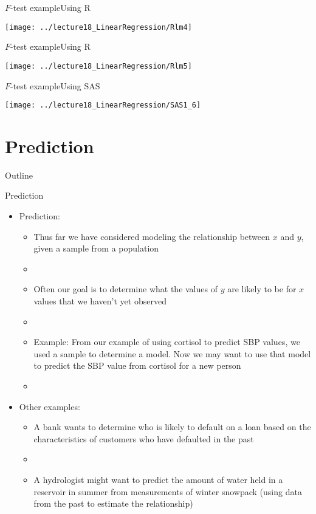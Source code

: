 \documentclass[xcolor=dvipsnames]{beamer}
\begin{document}
\begin{frame}{$F$-test example}{Using R}
	\begin{center}
		\texttt{[image: ../lecture18\_LinearRegression/Rlm4]}
	\end{center}
\end{frame}

\begin{frame}{$F$-test example}{Using R}
	\begin{center}
		\texttt{[image: ../lecture18\_LinearRegression/Rlm5]}
	\end{center}
\end{frame}

\begin{frame}{$F$-test example}{Using SAS}
	\begin{center}
		\texttt{[image: ../lecture18\_LinearRegression/SAS1\_6]}
	\end{center}
\end{frame}

\section{Prediction}

\begin{frame}{Outline}
\tableofcontents[currentsection,subsectionstyle=show/shaded/hide]
\end{frame}

\begin{frame}{Prediction}
	\begin{itemize}
		\item Prediction: \pause
		\begin{itemize}
			\item Thus far we have considered modeling the relationship between $x$ and $y$, given a sample from a population \pause
			\item[]
			\item Often our goal is to determine what the values of $y$ are likely to be for $x$ values that we haven't yet observed \pause
			\item[]
			\item Example: From our example of using cortisol to predict SBP values, we used a sample to determine a model. Now we may want to use that model to predict the SBP value from cortisol for a new person \pause
			\item[]
		\end{itemize}
		\item Other examples: \pause
	\begin{itemize}
		\item A bank wants to determine who is likely to default on a loan based on the characteristics of customers who have defaulted in the past \pause
		\item[]
		\item A hydrologist might want to predict the amount of water held in a reservoir in summer from measurements of winter snowpack (using data from the past to estimate the relationship)
	\end{itemize}
	\end{itemize}
\end{frame}
\end{document}
